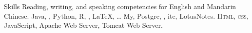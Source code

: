\begin{rubric}{Skills}
\entry*[Languages]
	Reading, writing, and speaking competencies for English and Mandarin Chinese.
	Java, , Python, R, , \LaTeX, \ldots
\entry*[Databases]
	My, Postgre, , ite, LotusNotes.
	\textsc{Html, css}, JavaScript, Apache Web Server, Tomcat Web Server.
\end{rubric}
